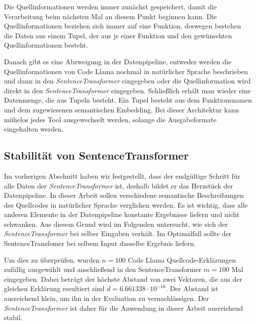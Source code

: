 \documentclass[12pt,letterpaper,ngerman]{article}
\begin{document}
Die Quellinformationen werden immer zunächst gespeichert, damit die 
Verarbeitung beim nächsten Mal an diesem Punkt beginnen kann.
Die Quellinformationen beziehen sich immer auf eine Funktion,
deswegen bestehen die Daten aus einem Tupel, der aus je einer
Funktion und den gewünschten Quellinformationen besteht. 

Danach gibt es eine Abzweigung in der Datenpipeline, entweder 
werden die Quellinformationen von Code Llama nochmal in natürlicher 
Sprache beschrieben und dann in den \textit{SentenceTransformer}
eingegeben oder die Quellinformation wird direkt in den 
\textit{SentenceTransformer} eingegeben. Schließlich erhält man wieder 
eine Datenmenge, die aus Tupeln besteht. Ein Tupel besteht aus dem 
Funktionsnamen und dem zugewiesenen semantischen Embedding. 
Bei dieser Architektur kann mühelos jedes Tool ausgewechselt werden,
solange die Ausgabeformate eingehalten werden. 
\subsection{Stabilität von SentenceTransformer}
Im vorherigen Abschnitt haben wir festgestellt, dass der endgültige
Schritt für alle Daten der \textit{SentenceTransformer} ist, deshalb
bildet 
er das Herzstück der Datenpipeline. In dieser Arbeit sollen 
verschiedene semantische Beschreibungen des Quellcodes in 
natürlicher Sprache verglichen werden. Es ist wichtig, dass alle 
anderen Elemente in der Datenpipeline konstante Ergebnisse 
liefern und nicht schwanken. Aus diesem Grund wird im Folgenden 
untersucht, wie sich der \textit{SentenceTransformer} bei selber
Eingaben verhält. Im Optimalfall sollte der SentenceTransfomer bei 
selbem Input dasselbe Ergebnis liefern.

Um dies zu überprüfen, wurden $n = 100$ Code Llama 
Quellcode-Erklärungen zufällig ausgewählt und anschließend in
den SentenceTransformer $m = 100$ Mal eingegeben. Dabei beträgt
der höchste Abstand von zwei Vektoren,
die aus der gleichen Erklärung resultiert sind 
$d = 6.661338\cdot 10^{-16}$. Der 
Abstand ist ausreichend klein, um ihn in der Evaluation zu 
vernachlässigen. Der \textit{SentenceTransformer} ist daher
für die Anwendung in dieser Arbeit ausreichend stabil.

%
\pagebreak
\end{document}
